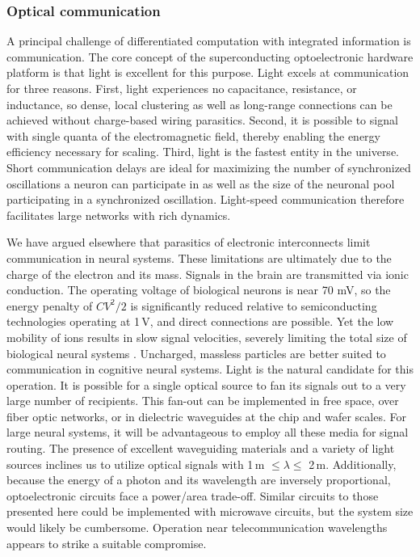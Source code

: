 \documentclass[aip,amsmath,amssymb,reprint,nofootinbib]{revtex4-1}
\begin{document}
\subsubsection{Optical communication}
A principal challenge of differentiated computation with integrated information is communication. The core concept of the superconducting optoelectronic hardware platform is that light is excellent for this purpose. Light excels at communication for three reasons. First, light experiences no capacitance, resistance, or inductance, so dense, local clustering as well as long-range connections can be achieved without charge-based wiring parasitics. Second, it is possible to signal with single quanta of the electromagnetic field, thereby enabling the energy efficiency necessary for scaling. Third, light is the fastest entity in the universe. Short communication delays are ideal for maximizing the number of synchronized oscillations a neuron can participate in as well as the size of the neuronal pool participating in a synchronized oscillation. Light-speed communication therefore facilitates large networks with rich dynamics.

We have argued elsewhere \cite{shbu2017} that parasitics of electronic interconnects limit communication in neural systems. These limitations are ultimately due to the charge of the electron and its mass. Signals in the brain are transmitted via ionic conduction. The operating voltage of biological neurons is near 70 mV, so the energy penalty of $C V^2/2$ is significantly reduced relative to semiconducting technologies operating at 1\,V, and direct connections are possible. Yet the low mobility of ions results in slow signal velocities, severely limiting the total size of biological neural systems \cite{bu2006}. Uncharged, massless particles are better suited to communication in cognitive neural systems. Light is the natural candidate for this operation. It is possible for a single optical source to fan its signals out to a very large number of recipients. This fan-out can be implemented in free space, over fiber optic networks, or in dielectric waveguides at the chip and wafer scales. For large neural systems, it will be advantageous to employ all these media for signal routing. The presence of excellent waveguiding materials and a variety of light sources inclines us to utilize optical signals with 1\,\textmu m $\le \lambda \le$ 2\,\textmu m. Additionally, because the energy of a photon and its wavelength are inversely proportional, optoelectronic circuits face a power/area trade-off. Similar circuits to those presented here could be implemented with microwave circuits, but the system size would likely be cumbersome. Operation near telecommunication wavelengths appears to strike a suitable compromise. 
\end{document}
